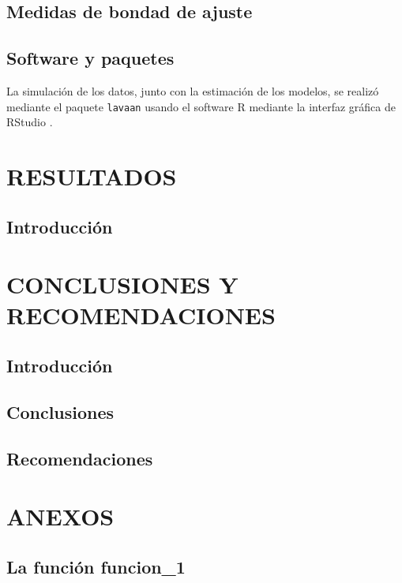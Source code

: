 \documentclass[
]{article}
\begin{document}
\subsection{Medidas de bondad de ajuste}

\subsection{Software y paquetes}

La simulación de los datos, junto con la estimación de los modelos, se
realizó mediante el paquete \texttt{lavaan} \cite{lavaan} usando el
software R \cite{R} mediante la interfaz gráfica de RStudio
\cite{RStudio}.

\newpage

\section{RESULTADOS}

\subsection{Introducción}

\newpage

\section{CONCLUSIONES Y RECOMENDACIONES}

\subsection{Introducción}

\subsection{Conclusiones}

\subsection{Recomendaciones}

\newpage

\section{ANEXOS}

\subsection{La función funcion\_1}
\end{document}
